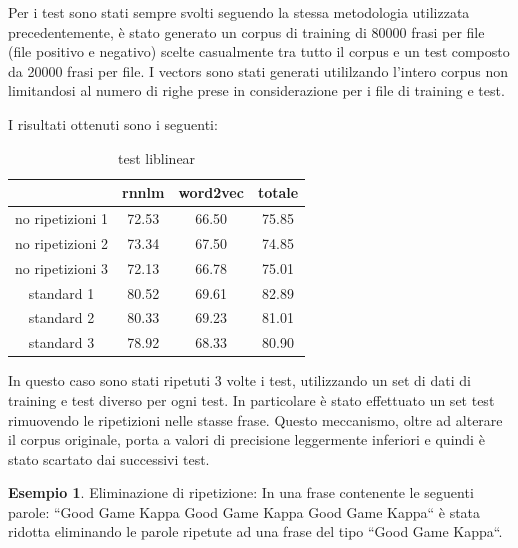 \documentclass[a4paper,12pt,openright,twoside]{report}
\theoremstyle{definition}
\newtheorem{es}{Esempio}[section]
\begin{document}
Per i test sono stati sempre svolti seguendo la stessa metodologia utilizzata precedentemente, è stato generato
un corpus di training di 80000 frasi per file (file positivo e negativo) scelte casualmente tra tutto il corpus e un test composto da 20000 frasi per file. I vectors sono stati generati utililzando l'intero corpus non limitandosi al numero di righe prese in considerazione per i file di training e test.

I risultati ottenuti sono i seguenti:
\begin{table}[h]
\begin{center}
\begin{tabular}{|c|c|c|c|}
\hline
& rnnlm & word2vec & totale \\
\hline
no ripetizioni 1 & 72.53 & 66.50 & 75.85  \\
\hline
no ripetizioni 2 & 73.34 & 67.50 & 74.85  \\
\hline
no ripetizioni 3 & 72.13 & 66.78 & 75.01  \\
\hline
standard 1 & 80.52 & 69.61 & 82.89 \\
\hline
standard 2 & 80.33 & 69.23 & 81.01 \\
\hline
standard 3 & 78.92 & 68.33 & 80.90 \\
\hline
\end{tabular}
\end{center}
\caption{test liblinear}
\label{tab:test1}
\end{table}

In questo caso sono stati ripetuti 3 volte i test, utilizzando un set di dati di training e test diverso per ogni test. In particolare è stato effettuato un set test rimuovendo le ripetizioni nelle stasse frase. Questo meccanismo, oltre ad alterare il corpus originale, porta a valori di precisione leggermente inferiori e quindi è stato scartato dai successivi test.
\begin{es}
Eliminazione di ripetizione: In una frase contenente le seguenti parole:  ``Good Game Kappa Good Game Kappa Good Game Kappa`` è stata ridotta eliminando le parole ripetute ad una frase del tipo ``Good Game Kappa``.
\end{es}
\end{document}

